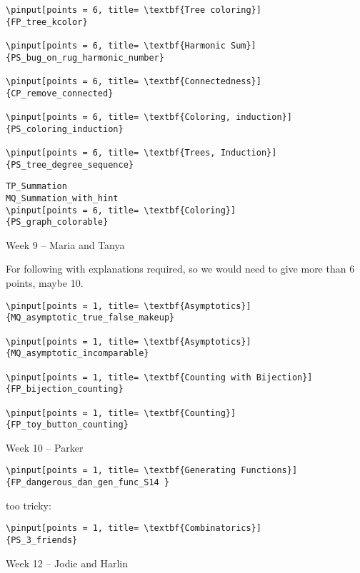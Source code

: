 \documentclass[quiz]{mcs}
\begin{document}
\begin{staffnotes}
\begin{verbatim}
\pinput[points = 6, title= \textbf{Tree coloring}]
{FP_tree_kcolor}

\pinput[points = 6, title= \textbf{Harmonic Sum}]
{PS_bug_on_rug_harmonic_number}

\pinput[points = 6, title= \textbf{Connectedness}]
{CP_remove_connected}

\pinput[points = 6, title= \textbf{Coloring, induction}]
{PS_coloring_induction}

\pinput[points = 6, title= \textbf{Trees, Induction}]
{PS_tree_degree_sequence}
\end{verbatim}

\begin{verbatim}
TP_Summation
MQ_Summation_with_hint
\pinput[points = 6, title= \textbf{Coloring}]
{PS_graph_colorable}
\end{verbatim}

\begin{center}
{\large Week 9 -- Maria and Tanya}
\end{center}

For following with explanations required, so we would need to give
more than 6 points, maybe 10.
\begin{verbatim}
\pinput[points = 1, title= \textbf{Asymptotics}]
{MQ_asymptotic_true_false_makeup} 

\pinput[points = 1, title= \textbf{Asymptotics}]
{MQ_asymptotic_incomparable}

\pinput[points = 1, title= \textbf{Counting with Bijection}]
{FP_bijection_counting}

\pinput[points = 1, title= \textbf{Counting}]
{FP_toy_button_counting}

\end{verbatim}

\begin{center}
{\large Week 10 -- Parker}
\end{center}

\begin{verbatim}
\pinput[points = 1, title= \textbf{Generating Functions}]
{FP_dangerous_dan_gen_func_S14 }
\end{verbatim}

too tricky:
\begin{verbatim}
\pinput[points = 1, title= \textbf{Combinatorics}]
{PS_3_friends}
\end{verbatim}

\begin{center}
{\large Week 12 -- Jodie and Harlin}
\end{center}


\end{staffnotes}
\end{document}
